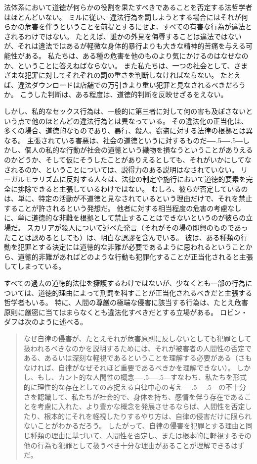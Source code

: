 \documentclass[paper=a4,book,openany]{jlreq}
\def\DDASH{―\kern-.5\zw―\kern-.5\zw―} %
\begin{document}
法体系において道徳が何らかの役割を果たすべきであることを否定する法哲学者はほとんどいない。
ミルに従い、違法行為を罰しようとする場合にはそれが何らかの危害を伴うということを前提とするにせよ、すべての有害な行為が違法とされるわけではない。
たとえば、誰かの外見を侮辱することは違法ではないが、それは違法ではあるが軽微な身体的暴行よりも大きな精神的苦痛を与える可能性がある。
私たちは、ある種の危害を他のものより気にかけるのはなぜなのか、ということに答えねばならない。
また私たちは、一つの社会として、さまざまな犯罪に対してそれぞれの罰の重さを判断しなければならない。
たとえば、違法ダウンロードは店舗での万引きより重い犯罪と見なされるべきだろうか。
こうした判断は、ある程度は、道徳的判断を反映せざるをえない。

しかし、私的なセックス行為は、一般的に第三者に対して何の害も及ぼさないという点で他のほとんどの違法行為とは異なっている。
その違法化の正当化は、多くの場合、道徳的なものであり、暴行、殺人、窃盗に対する法律の根拠とは異なる。
主張されている害悪は、社会の道徳というに対するものだ{\DDASH}しかし、個人の私的な行動が社会の道徳という織物を損なうということがありえるのかどうか、そして仮にそうしたことがありえるとしても、それがいかにしてなされるのか、ということについては、説得力のある説明はなされていない。
リーガルモラリズムに反対する人々は、法律の制定や施行において道徳的要素を完全に排除できると主張しているわけではない。
むしろ、彼らが否定しているのは、単に、特定の活動が不道徳と見なされているという理由だけで、それを禁止することが許されるという発想だ。
他者に対する相当程度の危害の考慮なしに、単に道徳的な非難を根拠として禁止することはできないというのが彼らの立場だ。
スカリアが殺人について述べた発言（それがその場の即興のものであったことは認めるとしても）は、明白な誤謬を含んでいる。
彼は、ある種類の行動を犯罪とする決定には道徳的な非難が必要であるように思われるということから、道徳的非難があればどのような行動も犯罪化することが正当化されると主張してしまっている。

すべての過去の道徳的法律を擁護するわけではないが、少なくとも一部の行為については、道徳的理由によって刑罰を科すことが正当化されるべきだと主張する哲学者もいる。
特に、人間の尊厳の極端な侵害に該当する行為は、たとえ危害原則に厳密に当てはまらなくとも違法化すべきだとする立場がある。
ロビン・ダフは次のように述べる。

\begin{quote}
なぜ自律の侵害が、たとえそれが危害原則に反しないとしても犯罪として扱われるべきなのかを説明するためには、それが被害者の人間性の否定である、あるいは深刻な軽視であるということを理解する必要がある（さもなければ、自律がなぜそれほど重要であるべきかを理解できない）。
しかし、もし、カント的な人間性の概念{\DDASH}すなわち、私たちを形式的に理性的な存在としてのみ捉える自律中心の考え{\DDASH}の不十分さを認識して、私たちが社会的で、身体を持ち、感情を伴う存在であることを考慮に入れた、より豊かな概念を発展させるならば、人間性を否定したり、根本的にそれを軽視したりするやり方は、自律の侵害だけに限られないことがわかるだろう。
したがって、自律の侵害を犯罪とする理由と同じ種類の理由に基づいて、人間性を否定し、または根本的に軽視するその他の行為も犯罪として扱うべき十分な理由があることが理解できるはずだ。
\citep[p.43]{duff01:_harms_wrong}
\end{quote}
\end{document}
